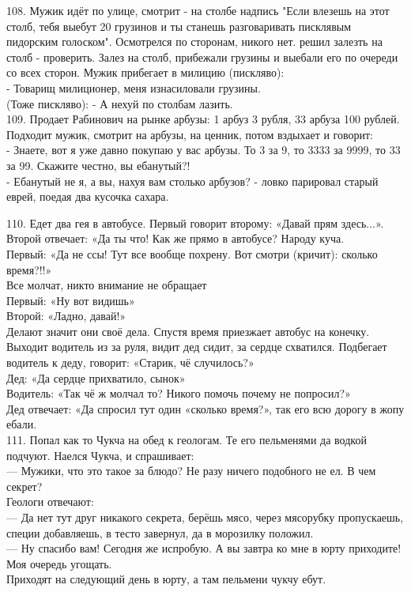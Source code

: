 \documentclass[a4paper,20pt,notitlepage]{extbook}
\begin{document}
	 108. Мужик идёт по улице, смотрит - на столбе надпись "Если влезешь на этот столб, тебя выебут 20 грузинов и ты станешь разговаривать писклявым пидорским голоском". Осмотрелся по сторонам, никого нет. решил залезть на столб - проверить. Залез на столб, прибежали грузины и выебали его по очереди со всех сторон. 
	 Мужик прибегает в милицию (пискляво): \\
	 - Товарищ милиционер, меня изнасиловали грузины. \\
	 (Тоже пискляво): - А нехуй по столбам лазить.\\
	 
	 109. Продает Рабинович на рынке арбузы: 1 арбуз 3 рубля, 33 арбуза 100 рублей. Подходит мужик, смотрит на арбузы, на ценник, потом вздыхает и говорит:\\
	 - Знаете, вот я уже давно покупаю у вас арбузы. То 3 за 9, то 3333 за 9999, то 33 за 99. Скажите честно, вы ебанутый?!\\
	 - Ебанутый не я, а вы, нахуя вам столько арбузов? - ловко парировал старый еврей, поедая два кусочка сахара.
	
	110. Едет два гея в автобусе. Первый говорит второму: «Давай прям здесь...».\\
	Второй отвечает: «Да ты что! Как же прямо в автобусе? Народу куча.\\
	Первый: «Да не ссы! Тут все вообще похрену. Вот смотри (кричит): сколько время?!!»\\
	Все молчат, никто внимание не обращает\\
	Первый: «Ну вот видишь»\\
	Второй: «Ладно, давай!»\\
	Делают значит они своё дела. Спустя время приезжает автобус на конечку. Выходит водитель из за руля, видит дед сидит, за сердце схватился. Подбегает водитель к деду, говорит: «Старик, чё случилось?»\\
	Дед: «Да сердце прихватило, сынок»\\
	Водитель: «Так чё ж молчал то? Никого помочь почему не попросил?»\\
	Дед отвечает: «Да спросил тут один «сколько время?», так его всю дорогу в жопу ебали.\\
	
	111. Попал как то Чукча на обед к геологам. Те его пельменями да водкой подчуют. Наелся Чукча, и спрашивает:\\
	— Мужики, что это такое за блюдо? Не разу ничего подобного не ел. В чем секрет?\\
	Геологи отвечают:\\
	— Да нет тут друг никакого секрета, берёшь мясо, через мясорубку пропускаешь, специи добавляешь, в тесто завернул, да в морозилку положил.\\
	— Ну спасибо вам! Сегодня же испробую. А вы завтра ко мне в юрту приходите! Моя очередь угощать.\\
	Приходят на следующий день в юрту, а там пельмени чукчу ебут.\\
	
\end{document}
